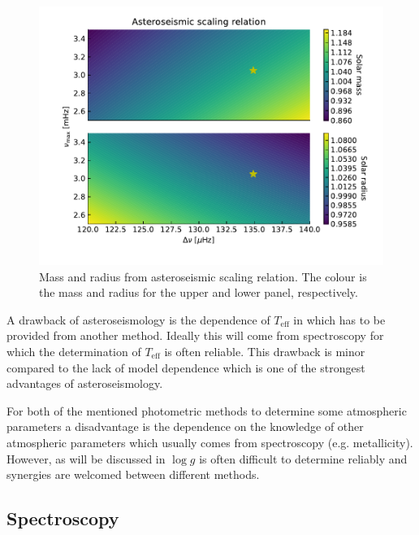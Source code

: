 \begin{figure}[htpb!]
    \centering
    \includegraphics[width=1.0\linewidth]{figures/scaling_relation.pdf}
    \caption{Mass and radius from asteroseismic scaling relation. The colour
             is the mass and radius for the upper and lower panel, respectively.}
    \label{fig:scaling}
\end{figure}

A drawback of asteroseismology is the dependence of $T_\mathrm{eff}$ in
 which has to be provided from another method. Ideally this
will come from spectroscopy for which the determination of $T_\mathrm{eff}$ is
often reliable. This drawback is minor compared to the lack of model dependence
which is one of the strongest advantages of asteroseismology.

For both of the mentioned photometric methods to determine some atmospheric
parameters a disadvantage is the dependence on the knowledge of other
atmospheric parameters which usually comes from spectroscopy (e.g. metallicity).
However, as will be discussed in  $\log g$ is
often difficult to determine reliably and synergies are welcomed between
different methods.

\subsection{Spectroscopy}
\label{sec:method_spectroscopy}



\section{\FASMA}
\label{sec:parameters}

